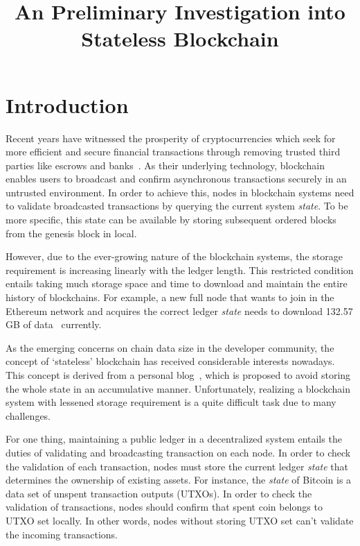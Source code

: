 \documentclass[conference]{IEEEtran}
\begin{document}
\title{An Preliminary Investigation into Stateless Blockchain}

\author{
}

\maketitle


\section{Introduction}
Recent years have witnessed the prosperity of cryptocurrencies which seek for more efficient and secure financial
transactions through removing trusted third parties like escrows and banks~\cite{SongWP00}.
%
As their underlying technology, blockchain enables users to broadcast and confirm asynchronous transactions securely in an untrusted environment.
%
In order to achieve this, nodes in blockchain systems need to validate broadcasted transactions by querying the current system \textit{state}.
%
To be more specific, this state can be available by storing subsequent ordered blocks from the genesis block in local.

However, due to the ever-growing nature of the blockchain systems, the storage requirement is increasing linearly with the ledger length.
%
This restricted condition entails taking much storage space and time to download and maintain the entire history of blockchains.
%
For example, a new full node that wants to join in the Ethereum network and acquires the correct ledger \textit{state} needs to download 132.57 GB of data~\cite{Ethereumstorage} currently. 

As the emerging concerns on chain data size in the developer community, the concept of `stateless' blockchain has received considerable interests nowadays.
%
This concept is derived from a personal blog~\cite{delayed-txo-commitments}, which is proposed to avoid storing the whole state in an accumulative manner.
%
Unfortunately, realizing a blockchain system with lessened storage requirement is a quite difficult task due to many challenges.

For one thing, maintaining a public ledger in a decentralized system entails the duties of validating and broadcasting transaction on each node.
%
In order to check the validation of each transaction, nodes must store the current ledger \textit{state} that determines the ownership of existing assets.
%
For instance, the \textit{state} of Bitcoin is a data set of unspent transaction outputs (UTXOs). 
%
In order to check the validation of transactions, nodes should confirm that spent coin belongs to UTXO set locally.
%
In other words, nodes without storing UTXO set can't validate the incoming transactions.
\end{document}
